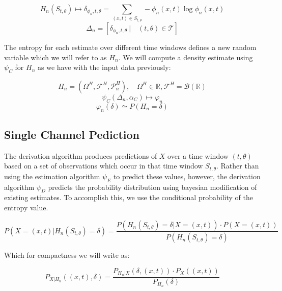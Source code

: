 \documentclass[10pt]{article}
\begin{document}
\begin{equation} \label{eq:HnSingle} H_n( S_{t,\theta} ) \mapsto \delta_{\phi_n,t,\theta} = \sum_{(x,t) \in S_{t,\theta}} -\phi_n(x,t) \log \phi_n(x,t) \end{equation}
\[ \Delta_n = [ \delta_{\phi_n,t,\theta} \ | \quad (t,\theta) \in \mathcal{T} ] \]

The entropy for each estimate over different time windows defines a new random variable which we will refer to as \( H_n \).  We will compute a density estimate using \(\psi_C \) for \( H_n \) as we have with the input data previously:

\begin{equation} \label{eq:HSingle} H_n = ( \Omega^H, \mathcal{F}^H, \mathcal{P}_n^H ), \quad \Omega^H \in \mathbb{R}, \mathcal{F}^H = \mathcal{B}(\mathbb{R}) \end{equation}
\begin{equation} \psi_C( \Delta_n , \alpha_C ) \mapsto \varphi_n \end{equation}
\begin{equation} \varphi_n(\delta) \simeq P \left( H_n = \delta \right)
\end{equation}

\subsection{Single Channel Pediction}
The derivation algorithm produces predictions of \(X \) over a time window \( (t,\theta) \) based on a set of observations which occur in that time window \(S_{t,\theta} \).  Rather than using the estimation algorithm \(\psi_E \) to predict these values, however, the derivation algorithm \(\psi_D \) predicts the probability distribution  using bayesian modification of existing estimates.  To accomplish this, we use the conditional probability of the entropy value.

\[ P \left( X = (x,t) | H_n(S_{t,\theta}) = \delta \right) = \frac { P \left( H_n( S_{t,\theta} ) = \delta | X = (x,t) \right) \cdot P \left( X = (x,t) \right) } { P \left( H_n( S_{t,\theta} ) = \delta \right) } \]

Which for compactness we will write as:

\begin{equation} P_{X|H_n} \left( (x,t), \delta \right) = \frac { P_{H_n|X} \left( \delta, (x,t) \right) \cdot P_X \left( (x,t) \right) } { P_{H_n} \left( \delta \right) } \end{equation}
\end{document}

